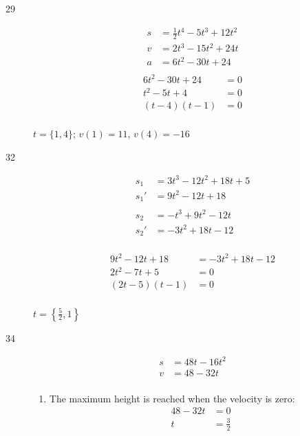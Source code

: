 \documentclass{exam}
\begin{document}
\begin{description}
\begin{enumerate}[a]
\end{enumerate}

\item[29]
\begin{align*}
  s &= \frac{1}{2}t^4 - 5t^3 + 12t^2 \\
  v &= 2t^3 - 15t^2 + 24t \\
  a &= 6t^2 - 30t + 24 \\
\end{align*}
\begin{align*}
  6t^2 - 30t + 24 &= 0 \\
  t^2 - 5t + 4 &= 0 \\
  (t-4)(t-1) &= 0 \\
\end{align*}

$t = \{1, 4\}$; $v(1) = 11$, $v(4) = -16$

\item[32]
\begin{align*}
  s_1 &= 3t^3 - 12t^2 + 18t + 5 \\
  s_1' &= 9t^2 - 12t + 18 \\
  \\
  s_2 &= -t^3 + 9t^2 - 12t \\
  s_2' &= -3t^2 + 18t - 12 \\
\end{align*}

\begin{align*}
  9t^2 - 12t + 18 &= -3t^2 + 18t - 12 \\
  2t^2 - 7t + 5 &= 0 \\
  (2t - 5)(t - 1) &= 0 \\
\end{align*}

$t = \left\{\frac{5}{2}, 1\right\}$

\item[34]
\begin{align*}
  s &= 48t - 16t^2 \\
  v &= 48 - 32t \\
\end{align*}


\begin{enumerate}[a]

\item
The maximum height is reached when the velocity is zero:
\begin{align*}
  48 - 32t &= 0 \\
  t &= \frac{3}{2} \\
\end{align*}


\end{enumerate}
\end{description}
\end{document}
